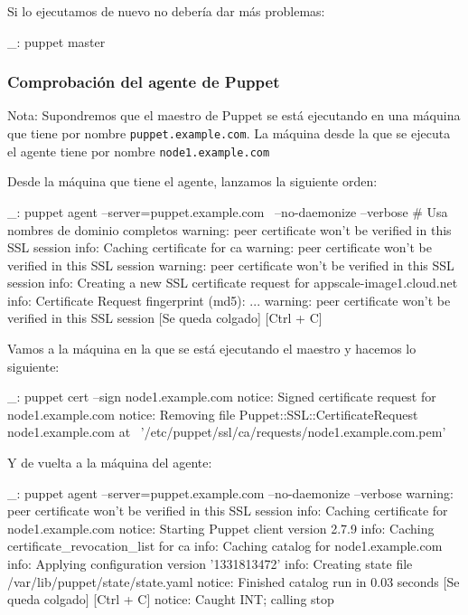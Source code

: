 Si lo ejecutamos de nuevo no debería dar más problemas:

\begin{bashcode}
_: puppet master
\end{bashcode}


\subsubsection{Comprobación del agente de Puppet}

Nota: Supondremos que el maestro de Puppet se está ejecutando en una máquina que tiene por nombre \texttt{puppet.example.com}. La máquina desde la que se ejecuta el agente tiene por nombre \texttt{node1.example.com}

Desde la máquina que tiene el agente, lanzamos la siguiente orden:

\begin{bashcode}
_: puppet agent --server=puppet.example.com \
--no-daemonize --verbose   # Usa nombres de dominio completos
warning: peer certificate won't be verified in this SSL session
info: Caching certificate for ca
warning: peer certificate won't be verified in this SSL session
warning: peer certificate won't be verified in this SSL session
info: Creating a new SSL certificate request for appscale-image1.cloud.net
info: Certificate Request fingerprint (md5): ... 
warning: peer certificate won't be verified in this SSL session
[Se queda colgado]
[Ctrl + C]
\end{bashcode}

Vamos a la máquina en la que se está ejecutando el maestro y hacemos lo siguiente:

\begin{bashcode}
_: puppet cert --sign node1.example.com
notice: Signed certificate request for node1.example.com
notice: Removing file Puppet::SSL::CertificateRequest node1.example.com at \
'/etc/puppet/ssl/ca/requests/node1.example.com.pem'
\end{bashcode}

Y de vuelta a la máquina del agente:

\begin{bashcode}
_: puppet agent --server=puppet.example.com --no-daemonize --verbose
warning: peer certificate won't be verified in this SSL session
info: Caching certificate for node1.example.com
notice: Starting Puppet client version 2.7.9
info: Caching certificate_revocation_list for ca
info: Caching catalog for node1.example.com
info: Applying configuration version '1331813472'
info: Creating state file /var/lib/puppet/state/state.yaml
notice: Finished catalog run in 0.03 seconds
[Se queda colgado]
[Ctrl + C]
notice: Caught INT; calling stop
\end{bashcode}

